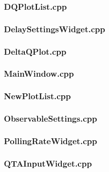 \subsubsection*{DQPlotList.cpp}


\subsubsection*{DelaySettingsWidget.cpp}


\subsubsection*{DeltaQPlot.cpp}


\subsubsection*{MainWindow.cpp}


\subsubsection*{NewPlotList.cpp}


\subsubsection*{ObservableSettings.cpp}


\subsubsection*{PollingRateWidget.cpp}


\subsubsection*{QTAInputWidget.cpp}


